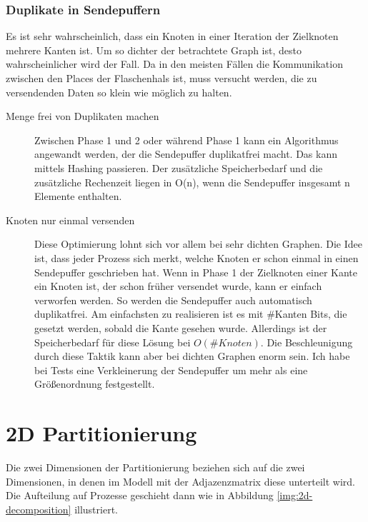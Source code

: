 \subsubsection{Duplikate in Sendepuffern} %
\label{sub:duplikate_in_sendepuffern}
Es ist sehr wahrscheinlich, dass ein Knoten in einer Iteration der Zielknoten mehrere Kanten ist. Um so dichter der betrachtete Graph ist, desto wahrscheinlicher wird der Fall. Da in den meisten Fällen die Kommunikation zwischen den Places der Flaschenhals ist, muss versucht werden, die zu versendenden Daten so klein wie möglich zu halten. 
\begin{description}
	\item[Menge frei von Duplikaten machen] Zwischen Phase 1 und 2 oder während Phase 1 kann ein Algorithmus angewandt werden, der die Sendepuffer duplikatfrei macht. Das kann mittels Hashing passieren. Der zusätzliche Speicherbedarf und die zusätzliche Rechenzeit liegen in O(n), wenn die Sendepuffer insgesamt n Elemente enthalten. 
	\item[Knoten nur einmal versenden] Diese Optimierung lohnt sich vor allem bei sehr dichten Graphen. Die Idee ist, dass jeder Prozess sich merkt, welche Knoten er schon einmal in einen Sendepuffer geschrieben hat. Wenn in Phase 1 der Zielknoten einer Kante ein Knoten ist, der schon früher versendet wurde, kann er einfach verworfen werden. So werden die Sendepuffer auch automatisch duplikatfrei. Am einfachsten zu realisieren ist es mit \#Kanten Bits, die gesetzt werden, sobald die Kante gesehen wurde. Allerdings ist der Speicherbedarf für diese Lösung bei $O(\# Knoten)$. Die Beschleunigung durch diese Taktik kann aber bei dichten Graphen enorm sein. Ich habe bei Tests eine Verkleinerung der Sendepuffer um mehr als eine Größenordnung festgestellt.
\end{description}



\section{2D Partitionierung} %
\label{sec:2d_partitionierung}

Die zwei Dimensionen der Partitionierung beziehen sich auf die zwei Dimensionen, in denen im Modell mit der Adjazenzmatrix diese unterteilt wird. Die Aufteilung auf Prozesse geschieht dann wie in Abbildung \ref{img:2d-decomposition} illustriert.

